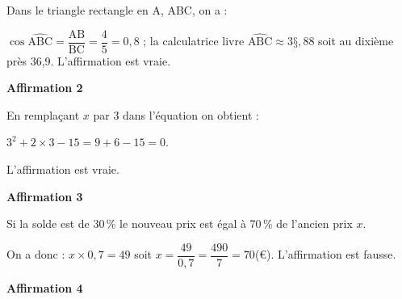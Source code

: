 
\medskip

%

%
Dans le triangle rectangle en A, ABC, on  a :

$\cos \widehat{\text{ABC}} = \dfrac{\text{AB}}{\text{BC}} = \dfrac{4}{5} = 0,8$ ; la calculatrice livre  $\widehat{\text{ABC}} \approx 3§,88$ soit au dixième près 36,9\degres. L’affirmation est vraie.
 
\medskip

\textbf{Affirmation 2}


En remplaçant $x$ par $3$ dans l’équation on obtient :

$3^2 + 2 \times 3 - 15 = 9 + 6 - 15 = 0$.

L’affirmation est vraie.

\medskip

\textbf{Affirmation 3}

Si la solde est de 30\,\% le nouveau prix est égal à 70\,\% de l’ancien prix $x$.

On a donc : $x \times 0,7 = 49$ soit $x = \dfrac{49}{0,7} = \dfrac{490}{7} = 70$(\euro). L’affirmation est fausse.
\medskip

\textbf{Affirmation 4}


